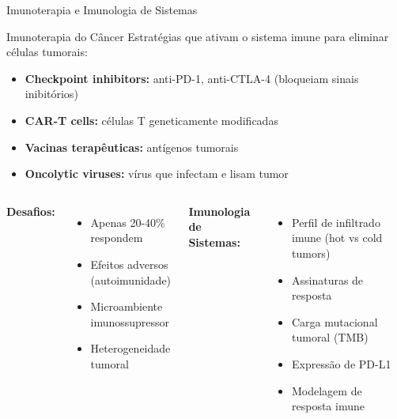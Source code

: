 \begin{frame}{Imunoterapia e Imunologia de Sistemas}
\begin{block}{Imunoterapia do Câncer}
Estratégias que ativam o sistema imune para eliminar células tumorais:
\begin{itemize}
    \item \textbf{Checkpoint inhibitors:} anti-PD-1, anti-CTLA-4 (bloqueiam sinais inibitórios)
    \item \textbf{CAR-T cells:} células T geneticamente modificadas
    \item \textbf{Vacinas terapêuticas:} antígenos tumorais
    \item \textbf{Oncolytic viruses:} vírus que infectam e lisam tumor
\end{itemize}
\end{block}

\vspace{0.3cm}

\begin{columns}
\textbf{Desafios:}
\begin{itemize}
    \item Apenas 20-40\% respondem
    \item Efeitos adversos (autoimunidade)
    \item Microambiente imunossupressor
    \item Heterogeneidade tumoral
\end{itemize}

\textbf{Imunologia de Sistemas:}
\begin{itemize}
    \item Perfil de infiltrado imune (hot vs cold tumors)
    \item Assinaturas de resposta
    \item Carga mutacional tumoral (TMB)
    \item Expressão de PD-L1
    \item Modelagem de resposta imune
\end{itemize}
\end{columns}

\vspace{0.3cm}

\end{frame}

